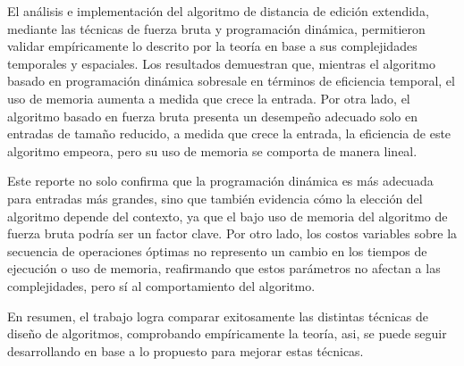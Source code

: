 

El análisis e implementación del algoritmo de distancia de 
edición extendida, mediante las técnicas de fuerza bruta y
programación dinámica, permitieron validar empíricamente lo descrito
por la teoría en base a sus complejidades temporales y espaciales. 
Los resultados demuestran que, mientras el algoritmo basado en 
programación dinámica sobresale en términos de eficiencia temporal,
el uso de memoria aumenta a medida que crece la entrada. Por otra lado,
el algoritmo basado en fuerza bruta 
presenta un desempeño adecuado solo en entradas de tamaño reducido, a 
medida que crece la entrada, la eficiencia de este algoritmo empeora,
pero su uso de memoria se comporta de manera lineal.

Este reporte no solo confirma que la programación dinámica 
es más adecuada para entradas más grandes, sino que también
evidencia cómo la elección del algoritmo depende del contexto, 
ya que el bajo uso de memoria del algoritmo de fuerza bruta podría
ser un factor clave.
Por otro lado, los costos variables sobre la secuencia
de operaciones óptimas no represento un cambio en los tiempos
de ejecución o uso de memoria, reafirmando que estos parámetros 
no afectan a las complejidades, pero sí al comportamiento del algoritmo.  

En resumen, el trabajo logra comparar exitosamente 
las distintas técnicas de diseño de algoritmos, 
comprobando empíricamente la teoría, asi, se puede 
seguir desarrollando en base a lo propuesto para mejorar
estas técnicas.














